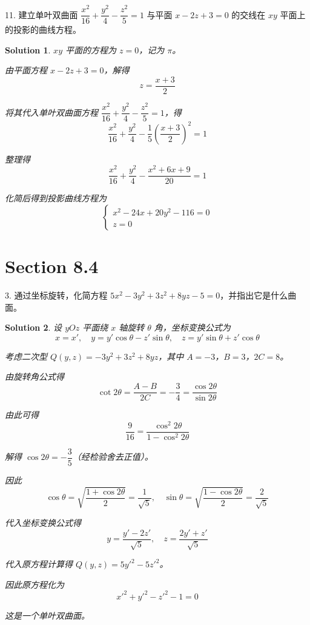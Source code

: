 \documentclass[a4paper,12pt]{article}
\newtheorem*{sol}{Solution}
\begin{document}
11. 建立单叶双曲面 $\dfrac{x^2}{16} + \dfrac{y^2}{4} - \dfrac{z^2}{5} = 1$ 与平面 $x - 2z + 3 = 0$ 的交线在 $xy$ 平面上的投影的曲线方程。

\begin{sol}
    $xy$ 平面的方程为 $z = 0$，记为 $\pi$。

    由平面方程 $x - 2z + 3 = 0$，解得
    $$z = \frac{x + 3}{2}$$

    将其代入单叶双曲面方程 $\dfrac{x^2}{16} + \dfrac{y^2}{4} - \dfrac{z^2}{5} = 1$，得
    $$\frac{x^2}{16} + \frac{y^2}{4} - \frac{1}{5}\left(\frac{x + 3}{2}\right)^2 = 1$$

    整理得
    $$\frac{x^2}{16} + \frac{y^2}{4} - \frac{x^2 + 6x + 9}{20} = 1$$

    化简后得到投影曲线方程为
    $$\begin{cases}
            x^2 - 24x + 20y^2 - 116 = 0 \\
            z = 0
        \end{cases}$$
\end{sol}

\section*{Section 8.4}

3. 通过坐标旋转，化简方程 $5x^2 - 3y^2 + 3z^2 + 8yz - 5 = 0$，并指出它是什么曲面。

\begin{sol}
    设 $yOz$ 平面绕 $x$ 轴旋转 $\theta$ 角，坐标变换公式为
    $$x = x', \quad y = y'\cos\theta - z'\sin\theta, \quad z = y'\sin\theta + z'\cos\theta$$

    考虑二次型 $Q(y,z) = -3y^2 + 3z^2 + 8yz$，其中 $A = -3$，$B = 3$，$2C = 8$。

    由旋转角公式得
    $$\cot 2\theta = \frac{A - B}{2C} = -\frac{3}{4} = \frac{\cos 2\theta}{\sin 2\theta}$$

    由此可得
    $$\frac{9}{16} = \frac{\cos^2 2\theta}{1 - \cos^2 2\theta}$$

    解得 $\cos 2\theta = -\dfrac{3}{5}$（经检验舍去正值）。

    因此
    $$\cos\theta = \sqrt{\frac{1 + \cos 2\theta}{2}} = \frac{1}{\sqrt{5}}, \quad \sin\theta = \sqrt{\frac{1 - \cos 2\theta}{2}} = \frac{2}{\sqrt{5}}$$

    代入坐标变换公式得
    $$y = \frac{y' - 2z'}{\sqrt{5}}, \quad z = \frac{2y' + z'}{\sqrt{5}}$$

    代入原方程计算得 $Q(y,z) = 5y'^2 - 5z'^2$。

    因此原方程化为
    $$x'^2 + y'^2 - z'^2 - 1 = 0$$

    这是一个单叶双曲面。
\end{sol}
\end{document}
